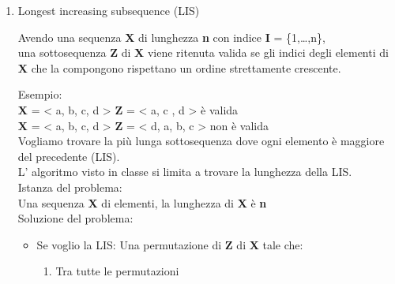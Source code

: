 \documentclass[11pt]{article}
\begin{document}
\begin{enumerate}
\item Longest increasing subsequence (LIS)
\label{sec:org6c642d1}

Avendo una sequenza \textbf{X} di lunghezza \textbf{n} con indice \textbf{I} = \{1,\ldots{},n\}, \\
una sottosequenza \textbf{Z} di \textbf{X} viene ritenuta valida se gli indici degli elementi
di \textbf{X} che la compongono rispettano un ordine strettamente crescente.

Esempio: \\
\textbf{X} = < a, b, c, d >  \textbf{Z} = < a, c , d > è valida \\
\textbf{X} = < a, b, c, d >  \textbf{Z} = < d, a, b, c > non è valida \\

Vogliamo trovare la più lunga sottosequenza dove ogni elemento è maggiore del precedente (LIS).\\
L' algoritmo visto in classe si limita a trovare la lunghezza della LIS. \\

Istanza del problema: \\
Una sequenza \textbf{X} di elementi, la lunghezza di \textbf{X} è \textbf{n} \\

Soluzione del problema: \\
\begin{itemize}
\item Se voglio la LIS:
Una permutazione di \textbf{Z} di \textbf{X} tale che: \\
\begin{enumerate}
\item Tra tutte le permutazioni 
\end{enumerate}
\end{itemize}
\end{enumerate}
\end{document}
